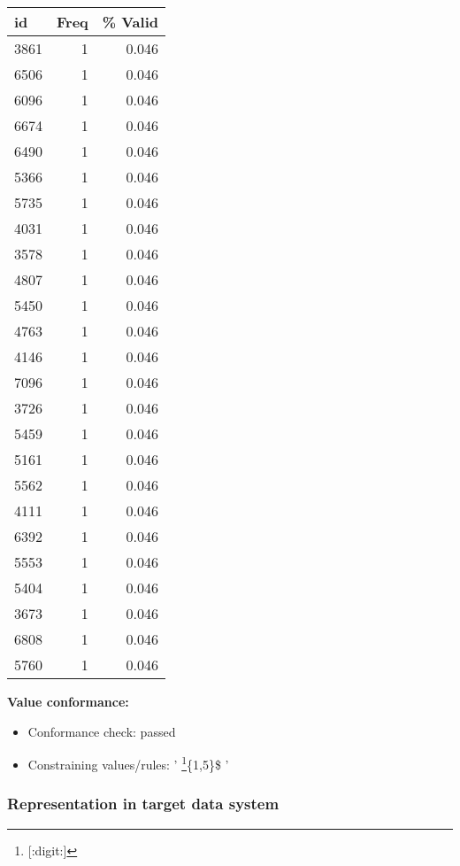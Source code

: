 \documentclass[
]{article}
\providecommand{\tightlist}{%
  \setlength{\itemsep}{0pt}\setlength{\parskip}{0pt}}
\begin{document}
\begin{table}[H]
\centering
\begin{tabular}{l|r|r}
\hline
\textbf{id} & \textbf{Freq} & \textbf{\% Valid}\\
\hline
3861 & 1 & 0.046\\
\hline
6506 & 1 & 0.046\\
\hline
6096 & 1 & 0.046\\
\hline
6674 & 1 & 0.046\\
\hline
6490 & 1 & 0.046\\
\hline
5366 & 1 & 0.046\\
\hline
5735 & 1 & 0.046\\
\hline
4031 & 1 & 0.046\\
\hline
3578 & 1 & 0.046\\
\hline
4807 & 1 & 0.046\\
\hline
5450 & 1 & 0.046\\
\hline
4763 & 1 & 0.046\\
\hline
4146 & 1 & 0.046\\
\hline
7096 & 1 & 0.046\\
\hline
3726 & 1 & 0.046\\
\hline
5459 & 1 & 0.046\\
\hline
5161 & 1 & 0.046\\
\hline
5562 & 1 & 0.046\\
\hline
4111 & 1 & 0.046\\
\hline
6392 & 1 & 0.046\\
\hline
5553 & 1 & 0.046\\
\hline
5404 & 1 & 0.046\\
\hline
3673 & 1 & 0.046\\
\hline
6808 & 1 & 0.046\\
\hline
5760 & 1 & 0.046\\
\hline
\end{tabular}
\end{table}

\textbf{Value conformance:}

\begin{itemize}
\tightlist
\item
  Conformance check: passed
\item
  Constraining values/rules: ' \footnote{{[}:digit:{]}}\{1,5\}\$ '
\end{itemize}

\newpage

\hypertarget{representation-in-target-data-system-14}{%
\subsubsection{\texorpdfstring{Representation in \textbf{target} data
system}{Representation in target data system}}\label{representation-in-target-data-system-14}}
\end{document}
